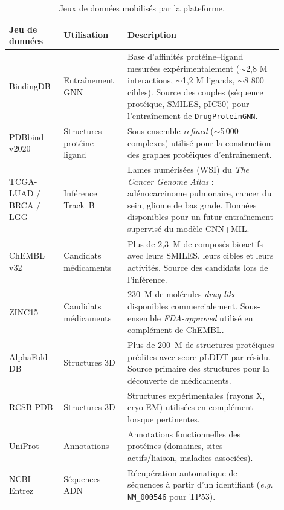 \documentclass[12pt,a4paper,oneside]{book}
\begin{document}
\begin{table}[H]
\caption{Jeux de données mobilisés par la plateforme.}
\label{tab:datasets}
\centering
\renewcommand{\arraystretch}{1.35}
\begin{tabular}{L{0.18\linewidth} L{0.20\linewidth} L{0.52\linewidth}}
\toprule
\textbf{Jeu de données} & \textbf{Utilisation} & \textbf{Description} \\
\midrule
BindingDB        & Entraînement GNN & Base d'affinités protéine--ligand mesurées expérimentalement ($\sim$2,8 M interactions, $\sim$1,2 M ligands, $\sim$8 800 cibles). Source des couples (séquence protéique, SMILES, pIC50) pour l'entraînement de \texttt{DrugProteinGNN}. \\
PDBbind v2020    & Structures protéine--ligand & Sous-ensemble \emph{refined} ($\sim$5\,000 complexes) utilisé pour la construction des graphes protéiques d'entraînement. \\
TCGA-LUAD / BRCA / LGG & Inférence Track~B & Lames numérisées (WSI) du \textit{The Cancer Genome Atlas} : adénocarcinome pulmonaire, cancer du sein, gliome de bas grade. Données disponibles pour un futur entraînement supervisé du modèle CNN+MIL. \\
ChEMBL v32       & Candidats médicaments & Plus de 2,3~M de composés bioactifs avec leurs SMILES, leurs cibles et leurs activités. Source des candidats lors de l'inférence. \\
ZINC15           & Candidats médicaments & 230~M de molécules \textit{drug-like} disponibles commercialement. Sous-ensemble \emph{FDA-approved} utilisé en complément de ChEMBL. \\
AlphaFold DB     & Structures 3D & Plus de 200~M de structures protéiques prédites avec score pLDDT par résidu. Source primaire des structures pour la découverte de médicaments. \\
RCSB PDB         & Structures 3D & Structures expérimentales (rayons X, cryo-EM) utilisées en complément lorsque pertinentes. \\
UniProt          & Annotations & Annotations fonctionnelles des protéines (domaines, sites actifs/liaison, maladies associées). \\
NCBI Entrez      & Séquences ADN & Récupération automatique de séquences à partir d'un identifiant (\textit{e.g.} \texttt{NM\_000546} pour TP53). \\
\bottomrule
\end{tabular}
\end{table}

\end{document}
